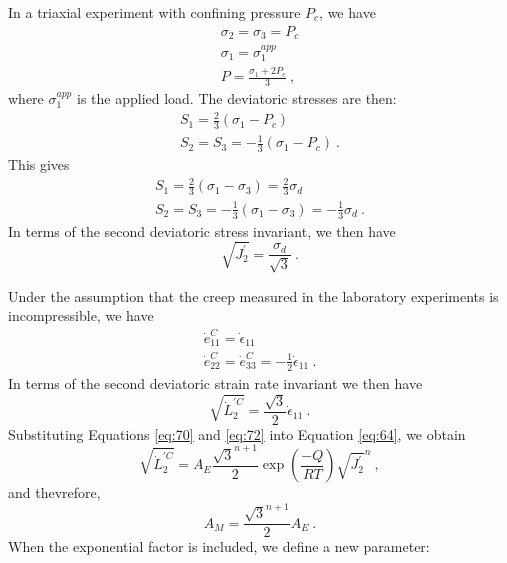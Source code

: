 In a triaxial experiment with confining pressure $P_{c}$, we have
\begin{gather}
\sigma_{2}=\sigma_{3}=P_{c}\nonumber \\
\sigma_{1}=\sigma_{1}^{app}\label{eq:67}\\
P=\frac{\sigma_{1}+2P_{c}}{3}\:,\nonumber 
\end{gather}
where $\sigma_{1}^{app}$ is the applied load. The deviatoric stresses
are then:
\begin{gather}
S_{1}=\frac{2}{3}\left(\sigma_{1}-P_{c}\right)\nonumber \\
S_{2}=S_{3}=-\frac{1}{3}\left(\sigma_{1}-P_{c}\right)\:.\label{eq:68}
\end{gather}
This gives
\begin{gather}
S_{1}=\frac{2}{3}\left(\sigma_{1}-\sigma_{3}\right)=\frac{2}{3}\sigma_{d}\nonumber \\
S_{2}=S_{3}=-\frac{1}{3}\left(\sigma_{1}-\sigma_{3}\right)=-\frac{1}{3}\sigma_{d}\:.\label{eq:69}
\end{gather}
In terms of the second deviatoric stress invariant, we then have
\begin{equation}
\sqrt{J_{2}^{\prime}}=\frac{\sigma_{d}}{\sqrt{3}}\:.\label{eq:70}
\end{equation}


Under the assumption that the creep measured in the laboratory experiments
is incompressible, we have
\begin{gather}
\dot{e}_{11}^{C}=\dot{\epsilon}_{11}\nonumber \\
\dot{e}_{22}^{C}=\dot{e}_{33}^{C}=-\frac{1}{2}\dot{\epsilon}_{11}\:.\label{eq:71}
\end{gather}
In terms of the second deviatoric strain rate invariant we then have
\begin{equation}
\sqrt{\dot{L}_{2}^{\prime C}}=\frac{\sqrt{3}}{2}\dot{\epsilon}_{11}\:.\label{eq:72}
\end{equation}
Substituting Equations \vref{eq:70} and \vref{eq:72} into Equation
\vref{eq:64}, we obtain
\begin{equation}
\sqrt{\dot{L}_{2}^{\prime C}}=A_{E}\frac{\sqrt{3}^{n+1}}{2}\exp\left(\frac{-Q}{RT}\right)\sqrt{J_{2}^{\prime}}^{n}\:,\label{eq:73}
\end{equation}
and thevrefore,
\begin{equation}
A_{M}=\frac{\sqrt{3}^{n+1}}{2}A_{E}\:.\label{eq:74}
\end{equation}
When the exponential factor is included, we define a new parameter:

